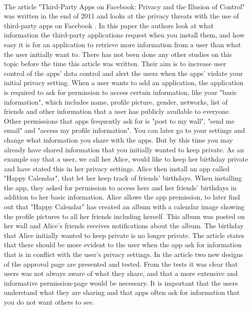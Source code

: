 \paragraph{}
The article "Third-Party Apps on Facebook: Privacy and the Illusion of Control" was written in the end of 2011 and looks at the privacy threats with the use of third-party apps on Facebook \cite{thirdPartyApps}. In this paper the authors look at what information the third-party applications request when you install them, and how easy it is for an application to retrieve more information from a user than what the user initially want to. There has not been done any other studies on this topic before the time this article was written. Their aim is to increase user control of the apps' data control and alert the users when the apps' violate your initial privacy setting. When a user wants to add an application, the application is required to ask for permission to access certain information, like your "basic information", which includes name, profile picture, gender, networks, list of friends and other information that a user has publicly available to everyone. Other permissions that apps frequently ask for is "post to my wall", "send me email" and "access my profile information". You can later go to your settings and change what information you share with the apps. But by this time you may already have shared information that you initially wanted to keep private. As an example say that a user, we call her Alice, would like to keep her birthday private and have stated this in her privacy settings. Alice then install an app called "Happy Calendar", that let her keep track of friends' birthdays. When installing the app, they asked for permission to access hers and her friends' birthdays in addition to her basic information. Alice allows the app premission, to later find out that "Happy Calendar" has created an album with a calendar image showing the profile pictures to all her friends including herself. This album was posted on her wall and Alice's friends receives notifications about the album. The birthday that Alice initially wanted to keep private is no longer private. The article states that there should be more evident to the user when the app ask for information that is in conflict with the user's privacy settings. In the article two new designs of the approval page are presented and tested.  From the tests it was clear that users was not always aware of what they share, and that a more extensive and informative permission-page would be necessary. It is important that the users understand what they are sharing and that apps often ask for information that you do not want others to see.



